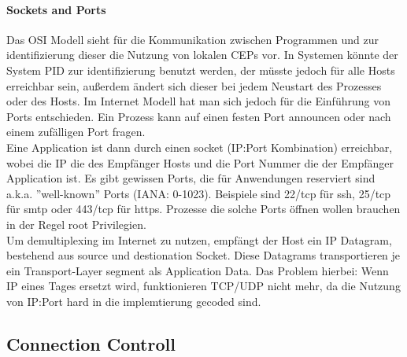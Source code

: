         \paragraph{Sockets and Ports} 
            Das OSI Modell sieht für die Kommunikation zwischen Programmen und zur identifizierung dieser die Nutzung von lokalen CEPs vor. In Systemen könnte der System PID zur identifizierung benutzt werden, der müsste jedoch für alle Hosts erreichbar sein, außerdem ändert sich dieser bei jedem Neustart des Prozesses oder des Hosts. Im Internet Modell hat man sich jedoch für die Einführung von Ports entschieden. Ein Prozess kann auf einen festen Port announcen oder nach einem zufälligen Port fragen. \\
            Eine Application ist dann durch einen socket (IP:Port Kombination) erreichbar, wobei die IP die des Empfänger Hosts und die Port Nummer die der Empfänger Application ist. Es gibt gewissen Ports, die für Anwendungen reserviert sind a.k.a. ''well-known'' Ports (IANA: 0-1023). Beispiele sind 22/tcp für ssh, 25/tcp für smtp oder 443/tcp für https. Prozesse die solche Ports öffnen wollen brauchen in der Regel root Privilegien. \\ 
            Um demultiplexing im Internet zu nutzen, empfängt der Host ein IP Datagram, bestehend aus source und destionation Socket. Diese Datagrams transportieren je ein Transport-Layer segment als Application Data. Das Problem hierbei: Wenn IP eines Tages ersetzt wird, funktionieren TCP/UDP nicht mehr, da die Nutzung von IP:Port hard in die implemtierung gecoded sind. 
    
    \subsection{Connection Controll}